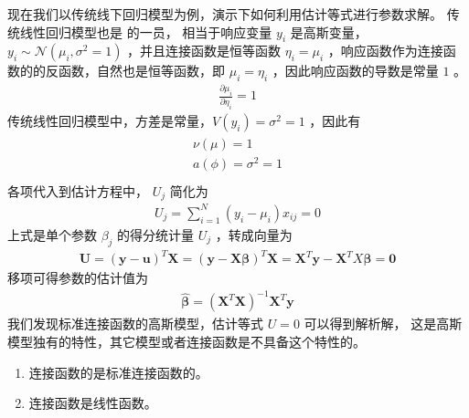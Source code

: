 \documentclass[letterpaper,10pt,english]{sphinxmanual}
\begin{document}
现在我们以传统线下回归模型为例，演示下如何利用估计等式进行参数求解。
传统线性回归模型也是  的一员，
相当于响应变量 \(y_i\) 是高斯变量，
\(y_i \sim \mathcal{N}(\mu_i,\sigma^2=1)\)
，并且连接函数是恒等函数 \(\eta_i=\mu_i\)
，响应函数作为连接函数的的反函数，自然也是恒等函数，即 \(\mu_i=\eta_i\)
，因此响应函数的导数是常量 \(1\)
。
\begin{equation}\label{equation:广义线性模型/estimate:广义线性模型/estimate:11}
\begin{split}\frac{\partial \mu_i }{\partial \eta_i} = 1\end{split}
\end{equation}
传统线性回归模型中，方差是常量，\(V(y_i)=\sigma^2=1\)
，因此有
\begin{align}\label{equation:广义线性模型/estimate:广义线性模型/estimate:12}\!\begin{aligned}
\nu(\mu) = 1\\
a(\phi) = \sigma^2=1\\
\end{aligned}\end{align}
各项代入到估计方程中，
\(U_j\) 简化为
\begin{equation}\label{equation:广义线性模型/estimate:广义线性模型/estimate:13}
\begin{split}U_j
= \sum_{i=1}^N (y_i-\mu_i ) x_{ij}
= 0\end{split}
\end{equation}
上式是单个参数 \(\beta_j\) 的得分统计量 \(U_j\)
，转成向量为
\begin{equation}\label{equation:广义线性模型/estimate:广义线性模型/estimate:14}
\begin{split}\pmb{U} = (\pmb{y}-\pmb{u})^T \pmb{X}
= (\pmb{y}- \pmb{X}\pmb{\beta})^T\pmb{X}
= \pmb{X}^T \pmb{y} - \pmb{X}^T X \pmb{\beta}
= \pmb{0}\end{split}
\end{equation}
移项可得参数的估计值为
\begin{equation}\label{equation:广义线性模型/estimate:广义线性模型/estimate:15}
\begin{split}\hat{\pmb{\beta}} = ( \pmb{X}^T \pmb{X})^{-1}\pmb{X}^T \pmb{y}\end{split}
\end{equation}
我们发现标准连接函数的高斯模型，估计等式 \(U=0\) 可以得到解析解，
这是高斯模型独有的特性，其它模型或者连接函数是不具备这个特性的。

\begin{enumerate}
%
\item {} 
连接函数的是标准连接函数的。

\item {} 
连接函数是线性函数。

\end{enumerate}
\end{document}
